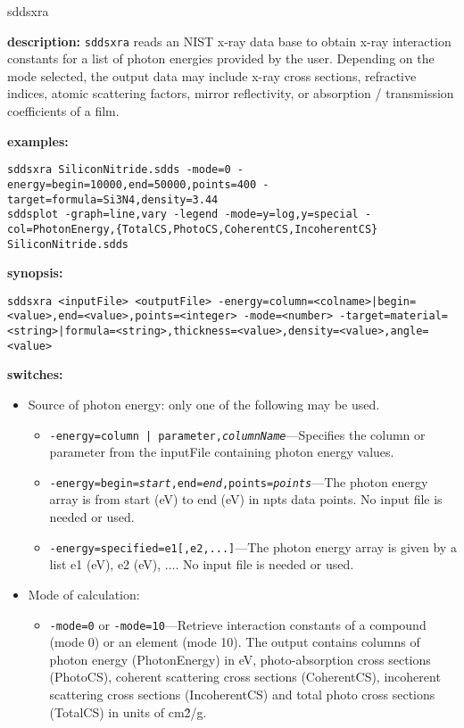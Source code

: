 \begin{sddsprog}{sddsxra}
\item \textbf{description:}
\verb|sddsxra| reads an NIST x-ray data base to obtain x-ray interaction constants for a list of photon energies provided by the user. Depending on the mode selected, the output data may include x-ray cross sections, refractive indices, atomic scattering factors, mirror reflectivity, or absorption / transmission coefficients of a film.
\item \textbf{examples:}
\begin{verbatim}
sddsxra SiliconNitride.sdds -mode=0 -energy=begin=10000,end=50000,points=400 -target=formula=Si3N4,density=3.44
sddsplot -graph=line,vary -legend -mode=y=log,y=special -col=PhotonEnergy,{TotalCS,PhotoCS,CoherentCS,IncoherentCS} SiliconNitride.sdds
\end{verbatim}
\item \textbf{synopsis:}
\begin{verbatim}
sddsxra <inputFile> <outputFile> -energy=column=<colname>|begin=<value>,end=<value>,points=<integer> -mode=<number> -target=material=<string>|formula=<string>,thickness=<value>,density=<value>,angle=<value>
\end{verbatim}
\item \textbf{switches:}
  \begin{itemize}
  \item Source of photon energy: only one of the following may be used.
    \begin{itemize}
      \item {\tt -energy={column | parameter},{\em columnName}}---Specifies the column or parameter from the inputFile containing photon energy values.
      \item {\tt -energy=begin={\em start},end={\em end},points={\em points}}---The photon energy array is from start (eV) to end (eV) in npts data points. No input file is needed or used.
      \item {\tt -energy=specified={e1[,e2,...]}}---The photon energy array is given by a list e1 (eV), e2 (eV), .... No input file is needed or used.
    \end{itemize}
  \item Mode of calculation:
    \begin{itemize}
      \item {\tt -mode=0} or {\tt -mode=10}---Retrieve interaction constants of a compound (mode 0) or an element (mode 10). The output contains columns of photon energy (PhotonEnergy) in eV, photo-absorption cross sections (PhotoCS), coherent scattering cross sections (CoherentCS), incoherent scattering cross sections (IncoherentCS) and total photo cross sections (TotalCS) in units of cm\^{2}/g.

\end{itemize}
\end{itemize}
\end{sddsprog}
